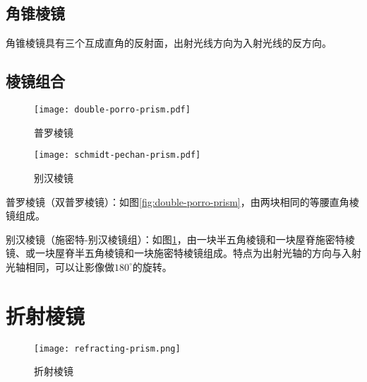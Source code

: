 \documentclass[cn,11pt]{elegantbook}
\begin{document}
\subsection{角锥棱镜}
角锥棱镜具有三个互成直角的反射面，出射光线方向为入射光线的反方向。

\subsection{棱镜组合}

\begin{figure}[htbp]
	\begin{minipage}[t]{0.45\textwidth}
		\centering
		\texttt{[image: double-porro-prism.pdf]}
		\caption{普罗棱镜}
		\label{fig:double-porro-prism}
	\end{minipage}
	\qquad
	\begin{minipage}[t]{0.45\textwidth}
		\centering
		\texttt{[image: schmidt-pechan-prism.pdf]}
		\caption{别汉棱镜}
		\label{fig:schmidt-pechan-prism}
	\end{minipage}
\end{figure}

普罗棱镜（双普罗棱镜）：如图\ref{fig:double-porro-prism}，由两块相同的等腰直角棱镜组成。

别汉棱镜（施密特-别汉棱镜组）：如图\ref{fig:schmidt-pechan-prism}，由一块半五角棱镜和一块屋脊施密特棱镜、或一块屋脊半五角棱镜和一块施密特棱镜组成。特点为出射光轴的方向与入射光轴相同，可以让影像做$180^{\circ}$的旋转。

\section{折射棱镜}

\begin{figure}[htbp]
	\centering
	\texttt{[image: refracting-prism.png]}
	\caption{折射棱镜}
	\label{fig:refracting-prism}
\end{figure}
\end{document}
